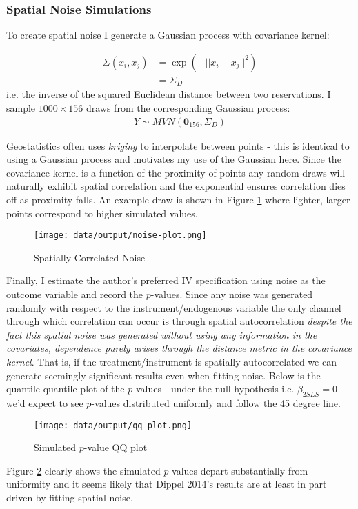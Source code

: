 \documentclass{article}
\begin{document}
\subsubsection*{Spatial Noise Simulations}

To create spatial noise I generate a Gaussian process with covariance kernel:

\begin{align*}
    \Sigma(x_i, x_j) &= \exp(- || x_i - x_j ||^2) \\
    &= \Sigma_D
\end{align*}
i.e. the inverse of the squared Euclidean distance between two reservations. I sample $1000 \times 156$ draws from the corresponding 
Gaussian process:
\begin{align*}
    Y \sim MVN(\mathbf{0}_{156}, \Sigma_D)
\end{align*}


Geostatistics often uses  \textit{kriging} to interpolate between points - this is identical to using a Gaussian process and motivates 
my use of the Gaussian here. Since the covariance kernel is a function of the proximity of points any random draws will naturally exhibit spatial 
correlation and the exponential ensures correlation dies off as proximity falls. An example draw is shown in Figure \ref{noise} where lighter, larger 
points correspond to higher simulated values.


\begin{figure}[htbp]
    \centering
    \texttt{[image: data/output/noise-plot.png]}
    \caption{Spatially Correlated Noise}
    \label{noise}
\end{figure}

Finally, I estimate the author's preferred IV specification using noise as the outcome variable and record the $p$-values. Since any noise 
was generated randomly with respect to the instrument/endogenous variable the only channel through which correlation can occur is through spatial 
autocorrelation \textit{despite the fact this spatial noise was generated without using any information in the covariates, dependence purely arises through 
the distance metric in the covariance kernel}. That is, if the treatment/instrument is spatially autocorrelated we can generate seemingly significant results 
even when fitting noise. Below is the quantile-quantile plot of the $p$-values - under the null hypothesis i.e. $\beta_{2SLS} = 0$ we'd expect to see $p$-values 
distributed uniformly and follow the 45 degree line.   

\begin{figure}[htbp]
    \centering
    \texttt{[image: data/output/qq-plot.png]}
    \caption{Simulated $p$-value QQ plot}
    \label{qq}
\end{figure}

Figure \ref{qq} clearly shows the simulated $p$-values depart substantially from uniformity and it seems likely that Dippel 2014's results are at least 
in part driven by fitting spatial noise.



\FloatBarrier


\end{document}
